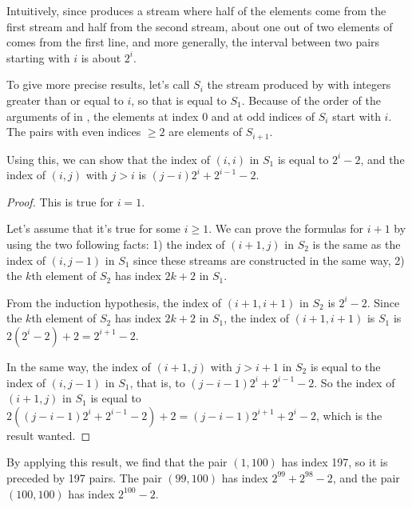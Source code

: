 \begin{exe}[3.66]
    Intuitively, since  produces a stream where half of the 
    elements come from the first stream and half from the second stream, about 
    one out of two elements of  comes from the first line, and 
    more generally, the interval between two pairs starting with $i$ is about 
    $2^i$.

    To give more precise results, let’s call $S_i$ the stream produced by 
     with integers greater than or equal to $i$, so that 
     is equal to $S_1$.
    Because of the order of the arguments of  in , 
    the elements at index 0 and at odd indices of $S_i$ start with $i$. The 
    pairs with even indices $\geq 2$ are elements of $S_{i + 1}$.

    Using this, we can show that the index of $(i, i)$ in $S_1$ is equal to $2^i 
    - 2$, and the index of
    $(i, j)$ with $j > i$ is $(j - i) 2^{i} + 2^{i - 1} - 2$.

    \begin{proof}
        This is true for $i = 1$.

        Let’s assume that it’s true for some $i \geq 1$. We can prove the 
        formulas for $i + 1$ by using the two following facts: 1) the index of 
        $(i + 1, j)$ in $S_2$ is the same as the index of $(i, j - 1)$ in $S_1$ 
        since these streams are constructed in the same way, 2) the $k$th 
        element of $S_2$ has index $2k + 2$ in $S_1$.

        From the induction hypothesis, the index of $(i + 1, i + 1)$ in $S_2$ is 
        $2^i - 2$. Since the $k$th element of $S_2$ has index $2k + 2$ in $S_1$, 
        the index of $(i + 1, i + 1)$ is $S_1$ is $2(2^i - 2) + 2 = 2^{i + 1} 
        - 2$.

        In the same way, the index of $(i + 1, j)$ with $j > i + 1$ in $S_2$ is 
        equal to the index of $(i, j - 1)$ in $S_1$, that is, to
        $(j - i - 1) 2^{i} + 2^{i - 1} - 2$. So the index of $(i + 1, j)$ in 
        $S_1$ is equal to\\
        $2((j - i - 1) 2^{i} + 2^{i - 1} - 2) + 2 = (j - i - 1)2^{i + 1} + 2^i 
        - 2$, which is the result wanted.
    \end{proof}

    By applying this result, we find that the pair $(1, 100)$ has index 197, so 
    it is preceded by 197 pairs. The pair $(99, 100)$ has index $2^{99} + 2^{98} 
    - 2$, and the pair $(100, 100)$ has index $2^{100} - 2$.
\end{exe}

